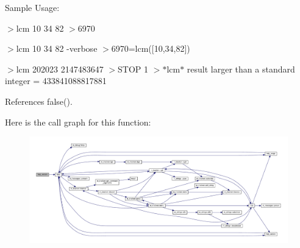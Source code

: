 Sample Usage\+:

$>$lcm 10 34 82 $>$6970

$>$lcm 10 34 82 -\/verbose $>$6970=lcm(\mbox{[}10,34,82\mbox{]})

$>$lcm 202023 2147483647 $>$S\+T\+OP 1 $>$$\ast$lcm$\ast$ result larger than a standard integer = 433841088817881 

References false().

Here is the call graph for this function\+:
\nopagebreak
\begin{figure}[H]
\begin{center}
\leavevmode
\includegraphics[width=350pt]{lcm_8f90_a39c21619b08a3c22f19e2306efd7f766_cgraph}
\end{center}
\end{figure}
